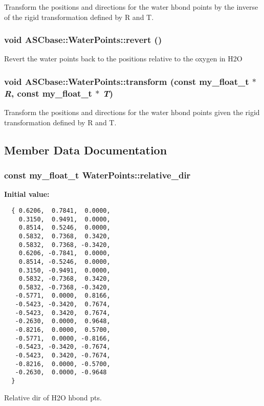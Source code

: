 Transform the positions and directions for the water hbond points by the inverse of the rigid transformation defined by R and T. 
\subsubsection{\setlength{\rightskip}{0pt plus 5cm}void ASCbase::Water\-Points::revert ()\hspace{0.3cm}{\tt  [inline]}}\label{classASCbase_1_1WaterPoints_ecc516195eeee66daeb5232b79566bb3}


Revert the water points back to the positions relative to the oxygen in H2O 
\subsubsection{\setlength{\rightskip}{0pt plus 5cm}void ASCbase::Water\-Points::transform (const my\_\-float\_\-t $\ast$ {\em R}, const my\_\-float\_\-t $\ast$ {\em T})\hspace{0.3cm}{\tt  [inline]}}\label{classASCbase_1_1WaterPoints_28e85993b24ad7d2d9f690972b399d19}


Transform the positions and directions for the water hbond points given the rigid transformation defined by R and T. 

\subsection{Member Data Documentation}
\subsubsection{\setlength{\rightskip}{0pt plus 5cm}const my\_\-float\_\-t \bf{Water\-Points::relative\_\-dir}\hspace{0.3cm}{\tt  [static, private]}}\label{classASCbase_1_1WaterPoints_9983412b6966d9c04890f819f3512332}


\textbf{Initial value:}

\begin{Code}\begin{verbatim} 
  { 0.6206,  0.7841,  0.0000,
    0.3150,  0.9491,  0.0000,
    0.8514,  0.5246,  0.0000,
    0.5832,  0.7368,  0.3420,
    0.5832,  0.7368, -0.3420,
    0.6206, -0.7841,  0.0000,
    0.8514, -0.5246,  0.0000,
    0.3150, -0.9491,  0.0000,
    0.5832, -0.7368,  0.3420,
    0.5832, -0.7368, -0.3420,
   -0.5771,  0.0000,  0.8166,
   -0.5423, -0.3420,  0.7674,
   -0.5423,  0.3420,  0.7674,
   -0.2630,  0.0000,  0.9648,
   -0.8216,  0.0000,  0.5700,
   -0.5771,  0.0000, -0.8166,
   -0.5423, -0.3420, -0.7674,
   -0.5423,  0.3420, -0.7674,
   -0.8216,  0.0000, -0.5700,
   -0.2630,  0.0000, -0.9648
  }
\end{verbatim}\end{Code}
Relative dir of H2O hbond pts. 

